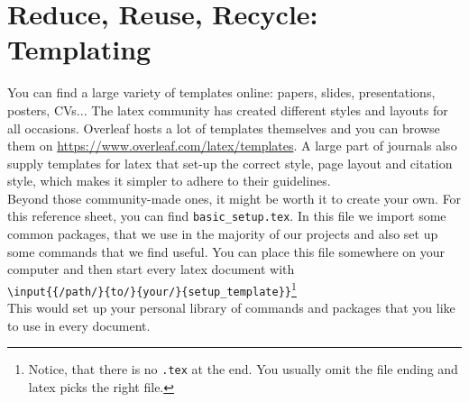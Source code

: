\section{Reduce, Reuse, Recycle: Templating}

You can find a large variety of templates online: papers, slides, presentations, posters, CVs... 
The latex community has created different styles and layouts for all occasions. Overleaf hosts a lot of templates themselves and you can browse them on \url{https://www.overleaf.com/latex/templates}. A large part of journals also supply templates for latex that set-up the correct style, page layout and citation style, which makes it simpler to adhere to their guidelines.\\
Beyond those community-made ones, it might be worth it to create your own. For this reference sheet, you can find \texttt{basic\_setup.tex}. 
In this file we import some common packages, that we use in the majority of our projects and also set up some commands that we find useful. You can place this file somewhere on your computer and then start every latex document with\\ 
\texttt{\textbackslash input\{\{/path/\}\{to/\}\{your/\}\{setup\_template\}\}}\footnote{Notice, that there is no \texttt{.tex} at the end. You usually omit the file ending and latex picks the right file.}\\
This would set up your personal library of commands and packages that you like to use in every document.